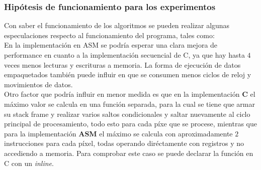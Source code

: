 \subsubsection{Hip\'otesis de funcionamiento para los experimentos}
Con saber el funcionamiento de los algoritmos se pueden realizar algunas especulaciones respecto al funcionamiento del programa, tales como: \\
En la implementaci\'on en ASM se podr\'ia esperar una clara mejora de performance en cuanto a la implementaci\'on secuencial de C, ya que hay hasta $4$ veces menos lecturas y escrituras a memoria. La forma de ejecuci\'on de datos empaquetados tambi\'en puede influir en que se consumen menos ciclos de reloj y movimientos de datos. \\
Otro factor que podr\'ia influir en menor medida es que en la implementaci\'on \textbf{C} el m\'aximo valor se calcula en una funci\'on separada, para la cual se tiene que armar su stack frame y realizar varios saltos condicionales y saltar nuevamente al ciclo principal de procesamiento, todo esto para cada p\'ixe que se procese, mientras que para la implementaci\'on \textbf{ASM} el m\'aximo se calcula con aproximadamente $2$ instrucciones para cada p\'ixel, todas operando dir\'ectamente con registros y no accediendo a memoria. Para comprobar este caso se puede declarar la funci\'on en C con un \emph{inline}.
